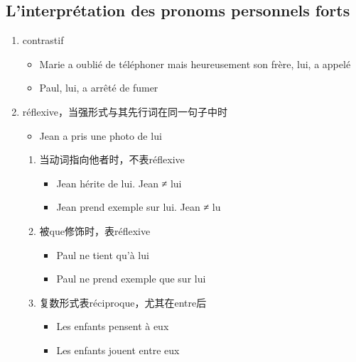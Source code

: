 \documentclass[UTF8]{report}
\begin{document}
\subsection{L’interprétation des pronoms personnels forts}
\begin{enumerate}
    \item contrastif
    \begin{itemize}
        \item Marie a oublié de téléphoner mais heureusement son frère, lui, a appelé
        \item Paul, lui, a arrêté de fumer
    \end{itemize}
    \item réflexive，当强形式与其先行词在同一句子中时
    \begin{itemize}
        \item Jean a pris une photo de lui
    \end{itemize}
    \begin{enumerate}
        \item 当动词指向他者时，不表réflexive
        \begin{itemize}
            \item Jean hérite de lui. Jean ≠ lui
            \item Jean prend exemple sur lui. Jean ≠ lu
        \end{itemize}
        \item 被que修饰时，表réflexive
        \begin{itemize}
            \item Paul ne tient qu’à lui
            \item Paul ne prend exemple que sur lui
        \end{itemize}
        \item 复数形式表réciproque，尤其在entre后
        \begin{itemize}
            \item Les enfants pensent à eux
            \item Les enfants jouent entre eux
        \end{itemize}
    \end{enumerate}
\end{enumerate}
\end{document}
